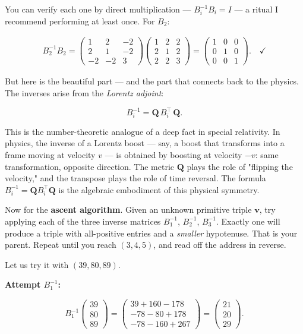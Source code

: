\documentclass[11pt,twoside,openright]{book}
\theoremstyle{definition}
\theoremstyle{remark}
\begin{document}
You can verify each one by direct multiplication --- $B_i^{-1} B_i = I$ --- a ritual I recommend performing at least once. For $B_2$:

\begin{align*}
B_2^{-1} B_2 = \begin{pmatrix} 1 & 2 & -2 \\ 2 & 1 & -2 \\ -2 & -2 & 3 \end{pmatrix} \begin{pmatrix} 1 & 2 & 2 \\ 2 & 1 & 2 \\ 2 & 2 & 3 \end{pmatrix} = \begin{pmatrix} 1 & 0 & 0 \\ 0 & 1 & 0 \\ 0 & 0 & 1 \end{pmatrix}. \quad \checkmark
\end{align*}

But here is the beautiful part --- and the part that connects back to the physics. The inverses arise from the \textit{Lorentz adjoint}:

\[B_i^{-1} = \mathbf{Q} \, B_i^\top \, \mathbf{Q}.\]

This is the number-theoretic analogue of a deep fact in special relativity. In physics, the inverse of a Lorentz boost --- say, a boost that transforms into a frame moving at velocity $v$ --- is obtained by boosting at velocity $-v$: same transformation, opposite direction. The metric $\mathbf{Q}$ plays the role of "flipping the velocity," and the transpose plays the role of time reversal. The formula $B_i^{-1} = \mathbf{Q} B_i^\top \mathbf{Q}$ is the algebraic embodiment of this physical symmetry.

Now for the \textbf{ascent algorithm}. Given an unknown primitive triple $\mathbf{v}$, try applying each of the three inverse matrices $B_1^{-1}$, $B_2^{-1}$, $B_3^{-1}$. Exactly one will produce a triple with all-positive entries and a \textit{smaller} hypotenuse. That is your parent. Repeat until you reach $(3, 4, 5)$, and read off the address in reverse.

Let us try it with $(39, 80, 89)$.

\textbf{Attempt $B_1^{-1}$:}

\[B_1^{-1} \begin{pmatrix} 39 \\ 80 \\ 89 \end{pmatrix} = \begin{pmatrix} 39 + 160 - 178 \\ -78 - 80 + 178 \\ -78 - 160 + 267 \end{pmatrix} = \begin{pmatrix} 21 \\ 20 \\ 29 \end{pmatrix}.\]
\end{document}
